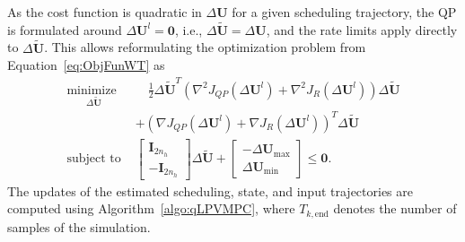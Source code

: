As the cost function is quadratic in $\Delta \bm{U}$ for a given scheduling trajectory, the QP is formulated around $\Delta \bm{U}^l = \bm{0}$, i.e., $\Delta \tilde{\bm{U}} = \Delta \bm{U}$, and the rate limits apply directly to $\Delta \tilde{\bm{U}}$. This allows reformulating the optimization problem from Equation~\eqref{eq:ObjFunWT} as
\begin{equation} \label{eq:ObjFunWTQP}
    \begin{aligned}
        \underset{\Delta \tilde{\bm{U}}}{\text{minimize }} & \quad
        \frac{1}{2} \Delta \tilde{\bm{U}}^T
        \left(\nabla^2 J_{QP} (\Delta \bm{U}^l) + \nabla^2 J_R(\Delta \bm{U}^l) \right) \Delta \tilde{\bm{U}} \\
        & + \left(\nabla J_{QP} (\Delta \bm{U}^l) + \nabla J_R(\Delta \bm{U}^l)\right)^T \Delta \tilde{\bm{U}} \\
        \text{subject to } & \begin{bmatrix} \bm{I}_{2n_h} \\ -\bm{I}_{2n_h} \end{bmatrix} \Delta \tilde{\bm{U}} +
        \begin{bmatrix} - \Delta \bm{U}_{\text{max}} \\ \Delta \bm{U}_{\text{min}} \end{bmatrix} \leq \bm{0}.
    \end{aligned}
\end{equation}
%
The updates of the estimated scheduling, state, and input trajectories are computed using Algorithm~\ref{algo:qLPVMPC}, where \(T_{k,\text{end}}\) denotes the number of samples of the simulation.

